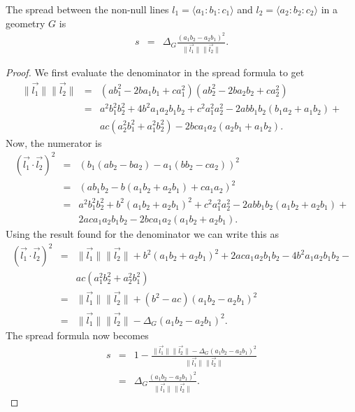 \begin{theorem}\label{th:alt-spread}The spread between the non-null lines $l_1 = \langle a_1\!:\!b_1\!:\!c_1 \rangle$ and $l_2 = \langle a_2\!:\!b_2\!:\!c_2 \rangle$ in a geometry $G$ is
\begin{eqnarray}
s & = & \Delta_G\frac{(a_1b_2 - a_2b_1)^2}{\|\vec{l_1}\|\|\vec{l_2}\|}.
\end{eqnarray}
\end{theorem}
\begin{proof}We first evaluate the denominator in the spread formula to get
\begin{eqnarray*}
\|\vec{l_1}\|\|\vec{l_2}\| & = & (ab_1^2 -2ba_1b_1 + ca_1^2)(ab_2^2 - 2ba_2b_2 + ca_2^2)\\
 & = & a^2b_1^2b_2^2 +4b^2a_1a_2b_1b_2 + c^2a_1^2a_2^2 -2abb_1b_2(b_1a_2 + a_1b_2) + \\
 &  & ac(a_2^2b_1^2 + a_1^2b_2^2) -2bca_1a_2(a_2b_1 + a_1b_2).
\end{eqnarray*}
Now, the numerator is
\begin{eqnarray*}
\left(\vec{l_1}\cdot \vec{l_2}\right)^2 & = & \left(b_1(ab_2 - ba_2) - a_1(bb_2 - ca_2)\right)^2\\
 & = & \left(ab_1b_2 - b(a_1b_2 + a_2b_1) + ca_1a_2\right)^2\\
 & = & a^2b_1^2b_2^2 + b^2(a_1b_2 + a_2b_1)^2 + c^2a_1^2a_2^2 -2abb_1b_2(a_1b_2 + a_2b_1) + \\
 &   & 2aca_1a_2b_1b_2 - 2bca_1a_2(a_1b_2 + a_2b_1).
\end{eqnarray*}
Using the result found for the denominator we can write this as
\begin{eqnarray*}
\left(\vec{l_1}\cdot \vec{l_2}\right)^2 & = & \|\vec{l_1}\|\|\vec{l_2}\| + b^2(a_1b_2 + a_2b_1)^2 + 2aca_1a_2b_1b_2 - 4b^2a_1a_2b_1b_2 - \\
 &  & ac(a_1^2b_2^2 + a_2^2b_1^2)\\
 & = & \|\vec{l_1}\|\|\vec{l_2}\| + (b^2 - ac)(a_1b_2 - a_2b_1)^2\\
 & = & \|\vec{l_1}\|\|\vec{l_2}\| - \Delta_G(a_1b_2 - a_2b_1)^2.
\end{eqnarray*}
The spread formula now becomes
\begin{eqnarray*}
s & = & 1 - \frac{\|\vec{l_1}\|\|\vec{l_2}\| - \Delta_G(a_1b_2 - a_2b_1)^2}{\|\vec{l_1}\|\|\vec{l_2}\|}\\
 & = & \Delta_G\frac{(a_1b_2 - a_2b_1)^2}{\|\vec{l_1}\|\|\vec{l_2}\|}.
\end{eqnarray*}
\end{proof}

